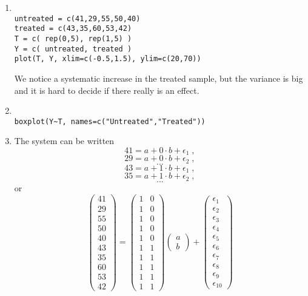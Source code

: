 \documentclass[a4paper,11pt]{article}
\begin{document}
\begin{enumerate}
\item 
\begin{verbatim}

untreated = c(41,29,55,50,40)
treated = c(43,35,60,53,42)
T = c( rep(0,5), rep(1,5) )
Y = c( untreated, treated )
plot(T, Y, xlim=c(-0.5,1.5), ylim=c(20,70))
\end{verbatim}
We notice a systematic increase in the treated sample, but the variance is big and
it is hard to decide if there really is an effect.

\item
\begin{verbatim}

boxplot(Y~T, names=c("Untreated","Treated"))
\end{verbatim}

\item The system can be written
$$41 = a + 0\cdot b + \epsilon_1 \; ,$$
$$29 = a + 0\cdot b + \epsilon_2 \; ,$$
$$...$$
$$43 = a + 1\cdot b + \epsilon_1 \; ,$$
$$35 = a + 1\cdot b + \epsilon_2 \; ,$$
$$...$$
or
$$
\left(
\begin{array}{c}
41 \\ 29 \\ 55 \\ 50 \\ 40 \\ 43 \\ 35 \\ 60 \\ 53 \\ 42
\end{array}
\right)
=
\left(
\begin{array}{cc}
1 & 0 \\ 1 & 0 \\ 1& 0 \\ 1 & 0 \\ 1 & 0 \\ 1 & 1 \\ 1 & 1 \\ 1 & 1 \\ 1 & 1 \\ 1 & 1
\end{array}
\right)
\left(
\begin{array}{c}
a \\ b
\end{array}
\right)
+
\left(
\begin{array}{c}
\epsilon_1 \\ \epsilon_2 \\ \epsilon_3 \\ \epsilon_4 \\ \epsilon_5 \\ \epsilon_6 \\ \epsilon_7 \\ \epsilon_8 \\ \epsilon_9 \\ \epsilon_{10} 
\end{array}
\right)
$$


\end{enumerate}
\end{document}
